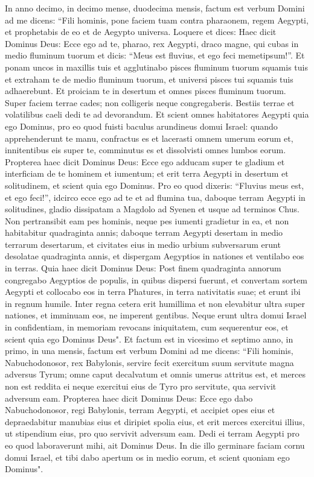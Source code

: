 \begin{biblechapter}  
\verse In anno decimo, in decimo mense, duodecima mensis, factum est verbum Domini ad me dicens: 
\verse “Fili hominis, pone faciem tuam contra pharaonem, regem Aegypti, et prophetabis de eo et de Aegypto universa. 
\verse Loquere et dices: Haec dicit Dominus Deus: Ecce ego ad te, pharao, rex Aegypti, draco magne, qui cubas in medio fluminum tuorum et dicis: “Meus est fluvius, et ego feci memetipsum!”. 
\verse Et ponam uncos in maxillis tuis et agglutinabo pisces fluminum tuorum squamis tuis et extraham te de medio fluminum tuorum, et universi pisces tui squamis tuis adhaerebunt. 
\verse Et proiciam te in desertum et omnes pisces fluminum tuorum. Super faciem terrae cades; non colligeris neque congregaberis. Bestiis terrae et volatilibus caeli dedi te ad devorandum. 
\verse Et scient omnes habitatores Aegypti quia ego Dominus, pro eo quod fuisti baculus arundineus domui Israel: 
\verse quando apprehenderunt te manu, confractus es et lacerasti omnem umerum eorum et, innitentibus eis super te, comminutus es et dissolvisti omnes lumbos eorum. 
\verse Propterea haec dicit Dominus Deus: Ecce ego adducam super te gladium et interficiam de te hominem et iumentum; 
\verse et erit terra Aegypti in desertum et solitudinem, et scient quia ego Dominus. Pro eo quod dixeris: “Fluvius meus est, et ego feci!”, 
\verse idcirco ecce ego ad te et ad flumina tua, daboque terram Aegypti in solitudines, gladio dissipatam a Magdolo ad Syenen et usque ad terminos Chus. 
\verse Non pertransibit eam pes hominis, neque pes iumenti gradietur in ea, et non habitabitur quadraginta annis; 
\verse daboque terram Aegypti desertam in medio terrarum desertarum, et civitates eius in medio urbium subversarum erunt desolatae quadraginta annis, et dispergam Aegyptios in nationes et ventilabo eos in terras. 
\verse Quia haec dicit Dominus Deus: Post finem quadraginta annorum congregabo Aegyptios de populis, in quibus dispersi fuerunt, 
\verse et convertam sortem Aegypti et collocabo eos in terra Phatures, in terra nativitatis suae; et erunt ibi in regnum humile. 
\verse Inter regna cetera erit humillima et non elevabitur ultra super nationes, et imminuam eos, ne imperent gentibus. 
\verse Neque erunt ultra domui Israel in confidentiam, in memoriam revocans iniquitatem, cum sequerentur eos, et scient quia ego Dominus Deus". 
\verse Et factum est in vicesimo et septimo anno, in primo, in una mensis, factum est verbum Domini ad me dicens: 
\verse “Fili hominis, Nabuchodonosor, rex Babylonis, servire fecit exercitum suum servitute magna adversus Tyrum; omne caput decalvatum et omnis umerus attritus est, et merces non est reddita ei neque exercitui eius de Tyro pro servitute, qua servivit adversum eam. 
\verse Propterea haec dicit Dominus Deus: Ecce ego dabo Nabuchodonosor, regi Babylonis, terram Aegypti, et accipiet opes eius et depraedabitur manubias eius et diripiet spolia eius, et erit merces exercitui illius, 
\verse ut stipendium eius, pro quo servivit adversum eam. Dedi ei terram Aegypti pro eo quod laboraverunt mihi, ait Dominus Deus. 
\verse In die illo germinare faciam cornu domui Israel, et tibi dabo apertum os in medio eorum, et scient quoniam ego Dominus". 
\end{biblechapter}

